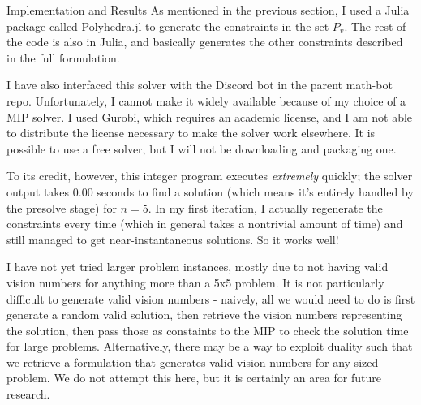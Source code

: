 \documentclass[12pt]{article}
\begin{document}
\begin{section}{Implementation and Results} 
As mentioned in the previous section, I used a Julia package called Polyhedra.jl to generate the constraints in the set $P_v$. The rest of the code is also in Julia, and basically generates the other constraints described in the full formulation.

I have also interfaced this solver with the Discord bot in the parent math-bot repo. Unfortunately, I cannot make it widely available because of my choice of a MIP solver. I used Gurobi, which requires an academic license, and I am not able to distribute the license necessary to make the solver work elsewhere. It is possible to use a free solver, but I will not be downloading and packaging one.

To its credit, however, this integer program executes \textit{extremely} quickly; the solver output takes 0.00 seconds to find a solution (which means it's entirely handled by the presolve stage) for $n=5$. In my first iteration, I actually regenerate the constraints every time (which in general takes a nontrivial amount of time) and still managed to get near-instantaneous solutions. So it works well!

I have not yet tried larger problem instances, mostly due to not having valid vision numbers for anything more than a 5x5 problem. It is not particularly difficult to generate valid vision numbers - naively, all we would need to do is first generate a random valid solution, then retrieve the vision numbers representing the solution, then pass those as constaints to the MIP to check the solution time for large problems. Alternatively, there may be a way to exploit duality such that we retrieve a formulation that generates valid vision numbers for any sized problem. We do not attempt this here, but it is certainly an area for future research.
\end{section}
\end{document}
